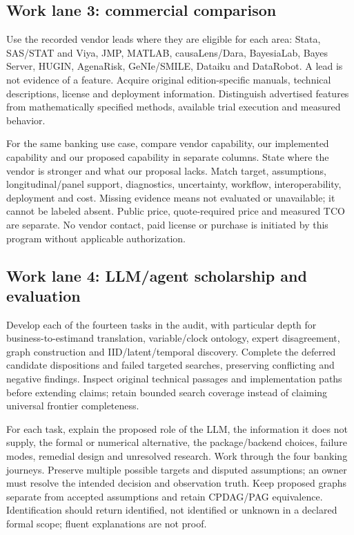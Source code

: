 \documentclass[
  10pt,
]{article}
\begin{document}
\hypertarget{work-lane-3-commercial-comparison}{%
\subsection{Work lane 3: commercial
comparison}\label{work-lane-3-commercial-comparison}}

Use the recorded vendor leads where they are eligible for each area:
Stata, SAS/STAT and Viya, JMP, MATLAB, causaLens/Dara, BayesiaLab, Bayes
Server, HUGIN, AgenaRisk, GeNIe/SMILE, Dataiku and DataRobot. A lead is
not evidence of a feature. Acquire original edition-specific manuals,
technical descriptions, license and deployment information. Distinguish
advertised features from mathematically specified methods, available
trial execution and measured behavior.

For the same banking use case, compare vendor capability, our
implemented capability and our proposed capability in separate columns.
State where the vendor is stronger and what our proposal lacks. Match
target, assumptions, longitudinal/panel support, diagnostics,
uncertainty, workflow, interoperability, deployment and cost. Missing
evidence means not evaluated or unavailable; it cannot be labeled
absent. Public price, quote-required price and measured TCO are
separate. No vendor contact, paid license or purchase is initiated by
this program without applicable authorization.

\hypertarget{work-lane-4-llmagent-scholarship-and-evaluation}{%
\subsection{Work lane 4: LLM/agent scholarship and
evaluation}\label{work-lane-4-llmagent-scholarship-and-evaluation}}

Develop each of the fourteen tasks in the audit, with particular depth
for business-to-estimand translation, variable/clock ontology, expert
disagreement, graph construction and IID/latent/temporal discovery.
Complete the deferred candidate dispositions and failed targeted
searches, preserving conflicting and negative findings. Inspect original
technical passages and implementation paths before extending claims;
retain bounded search coverage instead of claiming universal frontier
completeness.

For each task, explain the proposed role of the LLM, the information it
does not supply, the formal or numerical alternative, the
package/backend choices, failure modes, remedial design and unresolved
research. Work through the four banking journeys. Preserve multiple
possible targets and disputed assumptions; an owner must resolve the
intended decision and observation truth. Keep proposed graphs separate
from accepted assumptions and retain CPDAG/PAG equivalence.
Identification should return identified, not identified or unknown in a
declared formal scope; fluent explanations are not proof.
\end{document}
